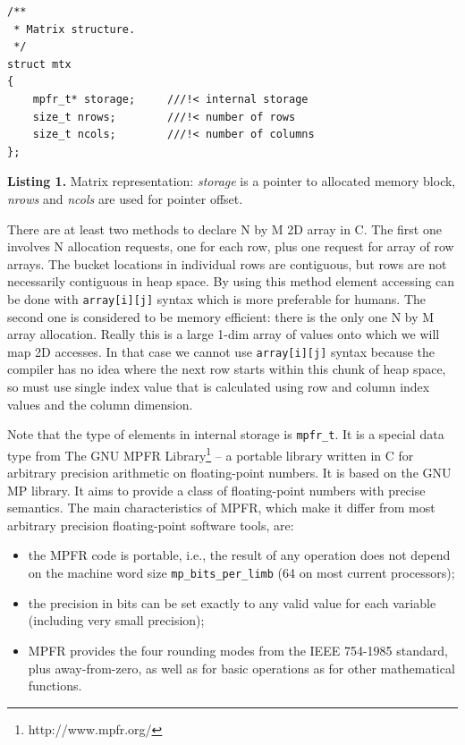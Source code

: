 \documentclass[runningheads,a4paper]{llncs}
\begin{document}
\begin{verbatim}
/**
 * Matrix structure.
 */
struct mtx
{
    mpfr_t* storage;     ///!< internal storage
    size_t nrows;        ///!< number of rows
    size_t ncols;        ///!< number of columns
};
\end{verbatim}
%
\noindent
{\small\textbf{Listing 1.} Matrix representation: \textit{storage} is a pointer to allocated memory block, \textit{nrows} and \textit{ncols} are used for pointer offset.\bigskip}

There are at least two methods to declare N by M 2D array in C. The first one involves N allocation requests, one for each row, plus one request for array of row arrays. The bucket locations in individual rows are contiguous, but rows are not necessarily contiguous in heap space. By using this method element accessing can be done with \texttt{array[i][j]} syntax which is more preferable for humans. The second one is considered to be memory efficient: there is the only one N by M array allocation. Really this is a large 1-dim array of values onto which we will map 2D accesses. In that case we cannot use \texttt{array[i][j]} syntax because the compiler has no idea where the next row starts within this chunk of heap space, so must use single index value that is calculated using row and column index values and the column dimension.

Note that the type of elements in internal storage is \texttt{mpfr\_t}. It is a special data type from The GNU MPFR Library\footnote{http://www.mpfr.org/} -- a portable library written in C for arbitrary precision arithmetic on floating-point numbers. It is based on the GNU MP library. It aims to provide a class of floating-point numbers with precise semantics. The main characteristics of MPFR, which make it differ from most arbitrary precision floating-point software tools, are:
\begin{itemize}
\item the MPFR code is portable, i.e., the result of any operation does not depend on the machine word size \texttt{mp\_bits\_per\_limb} (64 on most current processors);
\item the precision in bits can be set exactly to any valid value for each variable (including very small precision);
\item MPFR provides the four rounding modes from the IEEE 754-1985 standard, plus away-from-zero, as well as for basic operations as for other mathematical functions. 
\end{itemize}
\end{document}

